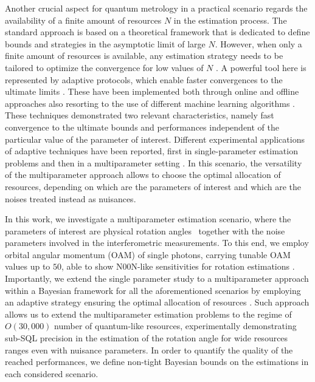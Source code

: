 \documentclass[aps,pra,twocolumn,notitlepage,superscriptaddress]{revtex4-1}
\begin{document}
Another crucial aspect for quantum metrology in a practical scenario regards the availability of a finite amount of resources $N$ in the estimation process. The standard approach is based on a theoretical framework that is dedicated to define bounds and strategies in the asymptotic limit of large $N$. However, when only a finite amount of resources is available, any estimation strategy needs to be tailored to optimize the convergence for low values of $N$ \cite{rubio2020quantum,rubio2019limited,rubio2020bayesian}. A powerful tool here is represented by adaptive protocols, which enable faster convergences to the ultimate limits \cite{wiseman1995adaptive,berry2000optimal}. These have been implemented both through online \cite{berni2015ab,Cimini:19} and offline \cite{hentschel2011efficient,lovett2013differential} approaches also resorting to the use of different machine learning algorithms \cite{hentschel2009adaptive,piccoloLume,rambhatla2020adaptive}. These techniques demonstrated two relevant characteristics, namely fast convergence to the ultimate bounds and performances independent of the particular value of the parameter of interest. Different experimental applications of adaptive techniques have been reported, first in single-parameter estimation problems \cite{armen2002adaptive,higgins2007entanglement,daryanoosh2018experimental,wheatley2010adaptive,piccoloLume,rambhatla2020adaptive} and then in a multiparameter setting \cite{Valeri2020}. In this scenario, the versatility of the multiparameter approach allows to choose the optimal allocation of resources, depending on which are the parameters of interest and which are the noises treated instead as nuisances. 

In this work, we investigate a multiparameter estimation scenario, where the parameters of interest are physical rotation angles~\cite{goldberg2018quantum,goldberg2021rotation} together with the noise parameters involved in the interferometric measurements. To this end, we employ orbital angular momentum (OAM) of single photons, carrying tunable OAM values up to $50$, able to show N00N-like sensitivities for rotation estimations \cite{dambrosio_gear2013,cimini2021non,Fickler13642,barnett2006resolution,jha2011supersensitive,PhysRevLett.127.263601}. Importantly, we extend the single parameter study \cite{cimini2021non} to a multiparameter approach within a Bayesian framework \cite{helstrom1976quantum,box2011bayesian,d2022experimental,rubio2020bayesian} for all the aforementioned scenarios by employing an adaptive strategy ensuring the optimal allocation of resources \cite{granade2012robust}. Such approach allows us to extend the multiparameter estimation problems to the regime of $O(30,000)$ number of quantum-like resources, experimentally demonstrating sub-SQL precision in the estimation of the rotation angle for wide resources ranges even with nuisance parameters. In order to quantify the quality of the reached performances, we define non-tight Bayesian bounds on the estimations in each considered scenario.
\end{document}
